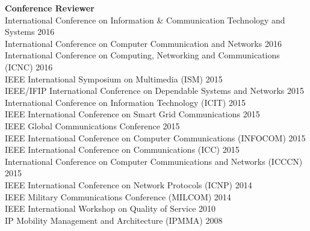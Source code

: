 \documentclass[margin,line]{res}
\begin{document}
\begin{resume}
{\bf Conference Reviewer}\\
International Conference on Information \& Communication Technology and Systems 2016 \\
International Conference on Computer Communication and Networks 2016 \\
International Conference on Computing, Networking and Communications (ICNC) 2016\\
IEEE International Symposium on Multimedia (ISM) 2015\\
IEEE/IFIP International Conference on Dependable Systems and Networks 2015 \\
International Conference on Information Technology (ICIT) 2015\\
IEEE International Conference on Smart Grid Communications 2015 \\
IEEE Global Communications Conference 2015\\
IEEE International Conference on Computer Communications (INFOCOM) 2015\\
IEEE International Conference on Communications (ICC) 2015\\
International Conference on Computer Communications and Networks (ICCCN) 2015\\
IEEE International Conference on Network Protocols (ICNP) 2014\\
IEEE Military Communications Conference (MILCOM) 2014\\
IEEE International Workshop on Quality of Service 2010\\
IP Mobility Management and Architecture (IPMMA) 2008

%
%



\end{resume}
\end{document}
